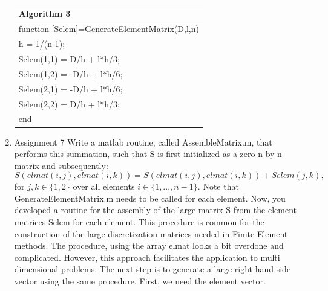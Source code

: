 \documentclass[a4paper,10pt]{report}
\begin{document}
\begin{enumerate}
\begin{table}
\begin{tabular}{ |l| } 
\hline
\textbf{Algorithm 3}\\
\hline
\hspace{0.5cm}function [Selem]=GenerateElementMatrix(D,l,n)\\
\hspace{1cm}h = 1/(n-1);\\
\hspace{1cm}Selem(1,1) = D/h + l*h/3;\\
\hspace{1cm}Selem(1,2) = -D/h + l*h/6;\\
\hspace{1cm}Selem(2,1) = -D/h + l*h/6;\\
\hspace{1cm}Selem(2,2) = D/h + l*h/3;\\
\hspace{0.5cm}end\\
\hline
\end{tabular}
\end{table}

\item{Assignment 7} Write a matlab routine, called AssembleMatrix.m, that performs
this summation, such that S is first initialized as a zero n-by-n matrix
and subsequently:\\
\begin{equation} \label{eq:6}
 S(elmat(i, j), elmat(i, k)) = S(elmat(i, j), elmat(i, k)) + Selem(j, k),
\end{equation}
for $ j, k \in \{1, 2\}$ over all elements $i \in \{1, . . . , n − 1\}$. Note that GenerateElementMatrix.m
needs to be called for each element.
Now, you developed a routine for the assembly of the large matrix S from
the element matrices Selem for each element. This procedure is common
for the construction of the large discretization matrices needed in Finite
Element methods. The procedure, using the array elmat looks a bit overdone
and complicated. However, this approach facilitates the application to multi
dimensional problems. The next step is to generate a large right-hand side
vector using the same procedure. First, we need the element vector.


\end{enumerate}
\end{document}
